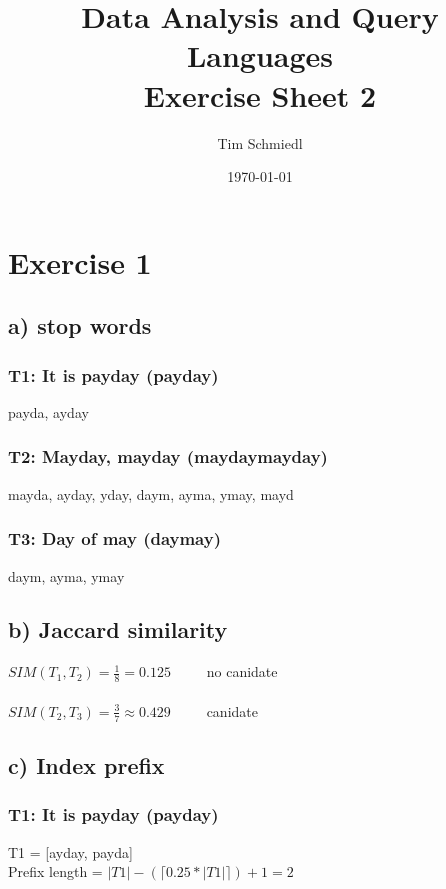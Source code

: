 \documentclass{article}
\begin{document}
\title{Data Analysis and Query Languages \\
 Exercise Sheet 2}
\date{\today}
\author{Tim Schmiedl}
\maketitle

\section*{Exercise 1}
\subsection*{a) stop words}
\subsubsection*{T1: It is payday (payday)}
payda, ayday

\subsubsection*{T2: Mayday, mayday (mayday\textvisiblespace mayday)}
mayda,
ayday,
yday\textvisiblespace ,
day\textvisiblespace m,
ay\textvisiblespace ma,
y\textvisiblespace may,
\textvisiblespace mayd

\subsubsection*{T3: Day of may (day\textvisiblespace may)}
day\textvisiblespace m,
ay\textvisiblespace ma,
y\textvisiblespace may

\subsection*{b) Jaccard similarity}
$SIM(T_1,T_2) = \frac{1}{8} = 0.125 \;\;\;\;\;\;\;\; $ no canidate\\
\\
$SIM(T_2,T_3) = \frac{3}{7} \approx 0.429 \;\;\;\;\;\;\;\; $ canidate\\


\subsection*{c) Index prefix}
\subsubsection*{T1: It is payday (payday)}
T1 = [ayday, payda]\\
Prefix length = $|T1| - (\lceil 0.25 * |T1| \rceil ) + 1 = 2$
\end{document}

